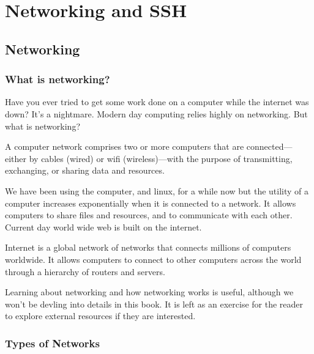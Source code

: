 \chapter{Networking and SSH}


\section{Networking}

\subsection{What is networking?}

Have you ever tried to get some work done on a computer
while the internet was down? It's a nightmare.
Modern day computing relies highly on networking.
But what is networking?

\begin{definition}[Networking]
A computer network comprises two or more computers
that are connected—either by cables (wired) or wifi
(wireless)—with the purpose of transmitting, exchanging,
or sharing data and resources.
\end{definition}

We have been using the computer, and linux, for a while now
but the utility of a computer increases exponentially when
it is connected to a network. It allows computers to share
files and resources, and to communicate with each other.
Current day world wide web is built on the internet.

\begin{definition}[Internet]
Internet is a global network of networks that connects
millions of computers worldwide. It allows computers to
connect to other computers across the world through a
hierarchy of routers and servers.
\end{definition}

Learning about networking and how networking works
is useful, although we won't be devling into details
in this book. It is left as an exercise for the reader
to explore external resources if they are interested.


\subsection{Types of Networks}

